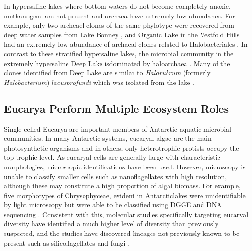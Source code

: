 In hypersaline lakes where bottom waters do not become completely anoxic, methanogens are not present and archaea have extremely low abundance. 
For example, only two archeael clones of the same phylotype were recovered from deep water samples from Lake Bonney \cite{Glatz2006}, 
and Organic Lake in the Vestfold Hills had an extremely low abundance of archaeal clones related to Halobacteriales \cite{Bowman2000b}. 
In contrast to these stratified hypersaline lakes, the microbial community in the extremely hypersaline Deep Lake isdominated by haloarchaea \cite{Bowman2000b}. 
Many of the clones identified from Deep Lake are similar to \textit{Halorubrum} (formerly \textit{Halobacterium}) \textit{lacusprofundi} which was isolated from the lake \cite{Franzmann1988}. 

\subsection{Eucarya Perform Multiple Ecosystem Roles}

Single-celled Eucarya are important members of Antarctic aquatic microbial communities.
In many Antarctic systems, eucaryal algae are the main photosynthetic organisms and in others, only heterotrophic protists occupy the top trophic level. 
As eucaryal cells are generally large with characteristic morphologies, microscopic identifications have been used. 
However, microscopy is unable to classify smaller cells such as nanoflagellates with high resolution, although these may constitute a high proportion of algal biomass.
For example, five morphotypes of Chrysophyceae, evident in Antarcticlakes were unidentifiable by light microscopy but were able to be classified using DGGE and DNA sequencing \cite{Unrein2005}.
Consistent with this, molecular studies specifically targeting eucaryal diversity \cite{Unrein2005, Mosier2007, Bielewicz2011} have identified a much higher level of diversity than previously suspected,
 and the studies have discovered lineages not previously known to be present such as silicoflagellates \cite{Unrein2005} and fungi \cite{Mosier2007, Bielewicz2011}.

